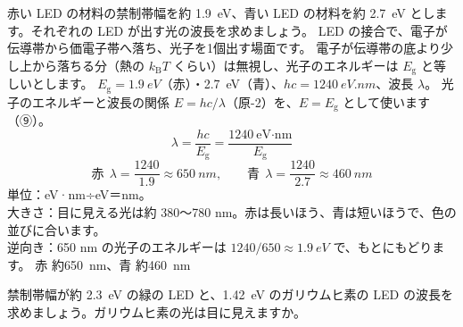 \label{ph:原-9:ex1}
\begin{phreidai}
赤い LED の材料の禁制帯幅を約 \qty{1.9}{eV}、青い LED の材料を約 \qty{2.7}{eV} とします。それぞれの LED が出す光の波長を求めましょう。
\phbamen
LED の接合で、電子が伝導帯から価電子帯へ落ち、光子を1個出す場面です。
\phmushi
電子が伝導帯の底より少し上から落ちる分（熱の $k_{\mathrm B}T$ くらい）は無視し、光子のエネルギーは $E_{\mathrm g}$ と等しいとします。
\phzu
$E_{\mathrm g}=\qty{1.9}{eV}$（赤）・\qty{2.7}{eV}（青）、$hc=\qty{1240}{eV.nm}$、波長 $\lambda$。
\phriyu
光子のエネルギーと波長の関係 $E=hc/\lambda$（原-2）を、$E=E_{\mathrm g}$ として使います（⑨）。
\phtateru
\[ \lambda=\frac{hc}{E_{\mathrm g}}=\frac{1240\ \text{eV·nm}}{E_{\mathrm g}} \]
\phtoku
\[ \text{赤}\ \ \lambda=\frac{1240}{1.9}\approx\qty{650}{nm},\qquad \text{青}\ \ \lambda=\frac{1240}{2.7}\approx\qty{460}{nm} \]
\phtashikame
単位：eV·nm÷eV＝nm。\\
大きさ：目に見える光は約 380〜780 nm。赤は長いほう、青は短いほうで、色の並びに合います。\\
逆向き：650 nm の光子のエネルギーは $1240/650\approx\qty{1.9}{eV}$ で、もとにもどります。
\kotae 赤 約\qty{650}{nm}、青 約\qty{460}{nm}
\end{phreidai}
\begin{jibun}
禁制帯幅が約 \qty{2.3}{eV} の緑の LED と、\qty{1.42}{eV} のガリウムヒ素の LED の波長を求めましょう。ガリウムヒ素の光は目に見えますか。
\end{jibun}


